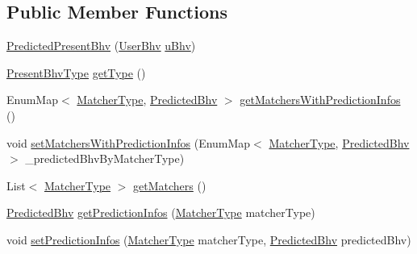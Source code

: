 \subsection*{\-Public \-Member \-Functions}
\begin{DoxyCompactItemize}
\item 
\hyperlink{classlab_1_1davidahn_1_1appshuttle_1_1view_1_1_predicted_present_bhv_a49a0e6d862c7e4dcf9fa37eebf7bf953}{\-Predicted\-Present\-Bhv} (\hyperlink{interfacelab_1_1davidahn_1_1appshuttle_1_1collect_1_1bhv_1_1_user_bhv}{\-User\-Bhv} \hyperlink{classlab_1_1davidahn_1_1appshuttle_1_1view_1_1_viewable_user_bhv_a562684126a3e756e8ebe246c89699ba9}{u\-Bhv})
\item 
\hyperlink{enumlab_1_1davidahn_1_1appshuttle_1_1view_1_1_present_bhv_type}{\-Present\-Bhv\-Type} \hyperlink{classlab_1_1davidahn_1_1appshuttle_1_1view_1_1_predicted_present_bhv_a8445d62aed9c58be504b1ac9718a34f5}{get\-Type} ()
\item 
\-Enum\-Map$<$ \hyperlink{enumlab_1_1davidahn_1_1appshuttle_1_1predict_1_1matcher_1_1_matcher_type}{\-Matcher\-Type}, \*
\hyperlink{classlab_1_1davidahn_1_1appshuttle_1_1predict_1_1_predicted_bhv}{\-Predicted\-Bhv} $>$ \hyperlink{classlab_1_1davidahn_1_1appshuttle_1_1view_1_1_predicted_present_bhv_aec5f961bb4e4287a180ab3c4e8bfa41d}{get\-Matchers\-With\-Prediction\-Infos} ()
\item 
void \hyperlink{classlab_1_1davidahn_1_1appshuttle_1_1view_1_1_predicted_present_bhv_a6ba9ae052bb17f76b8dbbacb3fe6e7ad}{set\-Matchers\-With\-Prediction\-Infos} (\-Enum\-Map$<$ \hyperlink{enumlab_1_1davidahn_1_1appshuttle_1_1predict_1_1matcher_1_1_matcher_type}{\-Matcher\-Type}, \hyperlink{classlab_1_1davidahn_1_1appshuttle_1_1predict_1_1_predicted_bhv}{\-Predicted\-Bhv} $>$ \-\_\-predicted\-Bhv\-By\-Matcher\-Type)
\item 
\-List$<$ \hyperlink{enumlab_1_1davidahn_1_1appshuttle_1_1predict_1_1matcher_1_1_matcher_type}{\-Matcher\-Type} $>$ \hyperlink{classlab_1_1davidahn_1_1appshuttle_1_1view_1_1_predicted_present_bhv_a772c9b07f6bcd47c47b376a53eccea28}{get\-Matchers} ()
\item 
\hyperlink{classlab_1_1davidahn_1_1appshuttle_1_1predict_1_1_predicted_bhv}{\-Predicted\-Bhv} \hyperlink{classlab_1_1davidahn_1_1appshuttle_1_1view_1_1_predicted_present_bhv_a79db9a4f1b994045870aae63dd6a957a}{get\-Prediction\-Infos} (\hyperlink{enumlab_1_1davidahn_1_1appshuttle_1_1predict_1_1matcher_1_1_matcher_type}{\-Matcher\-Type} matcher\-Type)
\item 
void \hyperlink{classlab_1_1davidahn_1_1appshuttle_1_1view_1_1_predicted_present_bhv_a7d6b398bfba2cd2c2822ddd89fe4c103}{set\-Prediction\-Infos} (\hyperlink{enumlab_1_1davidahn_1_1appshuttle_1_1predict_1_1matcher_1_1_matcher_type}{\-Matcher\-Type} matcher\-Type, \hyperlink{classlab_1_1davidahn_1_1appshuttle_1_1predict_1_1_predicted_bhv}{\-Predicted\-Bhv} predicted\-Bhv)

\end{DoxyCompactItemize}

